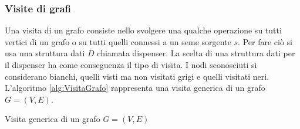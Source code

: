 \subsubsection*{Visite di grafi}
Una visita di un grafo consiste nello svolgere una qualche operazione su tutti vertici di un grafo o su tutti quelli connessi a un seme sorgente $s$.
Per fare ciò si usa una struttura dati $D$ chiamata dispenser.
La scelta di una struttura dati per il dispenser ha come conseguenza il tipo di visita.
I nodi sconosciuti si considerano bianchi, quelli visti ma non visitati grigi e quelli visitati neri.
L'algoritmo \ref{alg:VisitaGrafo} rappresenta una visita generica di un grafo $G=(V,E)$.

\begin{algorithm}
	
	\caption{Visita generica di un grafo $G=(V,E)$}
	\label{alg:VisitaGrafo}
\end{algorithm}
